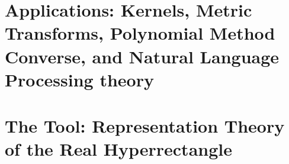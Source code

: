 \section{Applications: Kernels, Metric Transforms, Polynomial Method
  Converse, and Natural Language Processing theory}
\section{The Tool: Representation Theory of the Real Hyperrectangle}

